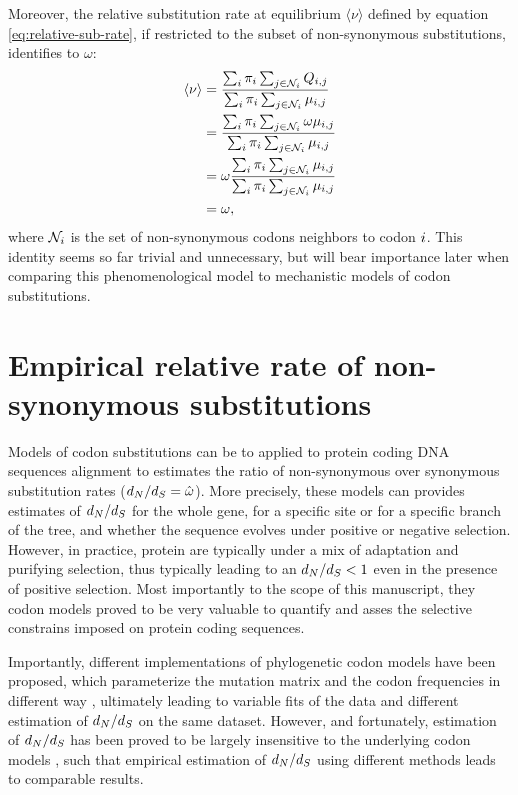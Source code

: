 Moreover, the relative substitution rate at equilibrium $\langle \nu \rangle$ defined by equation \ref{eq:relative-sub-rate}, if restricted to the subset of non-synonymous substitutions, identifies to $\omega$:
\begin{align}
\langle \nu \rangle & = \dfrac{ \sum_{{i}} \pi_{{i}} \sum_{{j} \in \mathcal{N}_{{i}}} Q_{{i}, {j}}}{\sum_{{i}} \pi_{{i}} \sum_{{j} \in \mathcal{N}_{{i}}} \mu_{{i}, {j}}} \\
					& = \dfrac{ \sum_{{i}} \pi_{{i}} \sum_{{j} \in \mathcal{N}_{{i}}} \omega \mu_{{i}, {j}}}{\sum_{{i}} \pi_{{i}} \sum_{{j} \in \mathcal{N}_{{i}}} \mu_{{i}, {j}}} \\
					& = \omega \dfrac{ \sum_{{i}} \pi_{{i}} \sum_{{j} \in \mathcal{N}_{{i}}} \mu_{{i}, {j}}}{\sum_{{i}} \pi_{{i}} \sum_{{j} \in \mathcal{N}_{{i}}} \mu_{{i}, {j}}} \\
					& = \omega, 
\end{align}
where $\mathcal{N}_{{i}}$ is the set of non-synonymous codons neighbors to codon ${i}$.
This identity seems so far trivial and unnecessary, but will bear importance later when comparing this phenomenological model to mechanistic models of codon substitutions.


\section{Empirical relative rate of non-synonymous substitutions}
Models of codon substitutions can be to applied to protein coding DNA sequences alignment to estimates the ratio of non-synonymous over synonymous substitution rates ($d_N / d_S=\hat{\omega}$).
More precisely, these models can provides estimates of $d_N / d_S$ for the whole gene, for a specific site or for a specific branch of the tree, and whether the sequence evolves under positive or negative selection.
However, in practice, protein are typically under a mix of adaptation and purifying selection, thus typically leading to an $d_N / d_S<1$ even in the presence of positive selection.
Most importantly to the scope of this manuscript, they codon models proved to be very valuable to quantify and asses the selective constrains imposed on protein coding sequences.

Importantly, different implementations of phylogenetic codon models have been proposed, which parameterize the mutation matrix and the codon frequencies in different way \citep{Muse1994, Goldman1994}, ultimately leading to variable fits of the data and different estimation of $d_N / d_S$ on the same dataset. 
However, and fortunately, estimation of $d_N / d_S$ has been proved to be largely insensitive to the underlying codon models \citep{Spielman2018}, such that empirical estimation of $d_N / d_S$ using different methods leads to comparable results.

